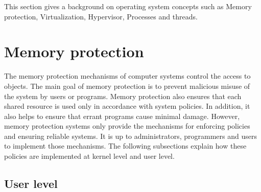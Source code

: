 This section gives a background on operating system concepts such as Memory protection, Virtualization, Hypervisor, Processes and threads.

\section{Memory protection}

The memory protection mechanisms of computer systems control the access to objects. The main goal of memory protection is to prevent malicious misuse of the system by users or programs. Memory protection also ensures that each shared resource is used only in accordance with system policies. In addition, it also helps to ensure that errant programs cause minimal damage. However, memory protection systems only provide the mechanisms for enforcing policies and ensuring reliable systems. It is up to administrators, programmers and users to implement those mechanisms\cite{Galvin}\cite{Graham:1971:PPP:1478873.1478928}. The following subsections explain how these policies are implemented at kernel level and user level. 

\subsection{User level}

